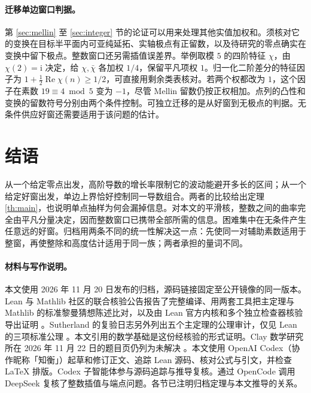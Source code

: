 \documentclass[UTF8,fontset=none,a4paper,11pt]{ctexart}
\theoremstyle{definition}
\newcommand{\re}{\operatorname{Re}}\newcommand{\e}{\varepsilon}
\begin{document}
\paragraph{迁移单边窗口判据。}
第 \ref{sec:mellin} 至 \ref{sec:integer} 节的论证可以用来处理其他实值加权和。须核对它的变换在目标半平面内可亚纯延拓、实轴极点有正留数，以及待研究的零点确实在变换中留下极点。整数窗口还另需插值误差界。举例取模 $5$ 的四阶特征 $\chi$，由 $\chi(2)=\mathrm i$ 决定，给 $\chi,\bar\chi$ 各加权 $1/4$，保留平凡项权 $1$。归一化二阶差分的特征因子为 $1+\tfrac12\re\chi(n)\ge1/2$，可直接用剩余类表核对。若两个权都改为 $1$，这个因子在素数 $19\equiv4\bmod5$ 变为 $-1$，尽管 Mellin 留数仍按正权相加。点列的凸性和变换的留数符号分别由两个条件控制。可独立迁移的是从好窗到无极点的判据。无条件供应好窗还需要适用于该问题的估计。


\section{结语}
从一个给定零点出发，高阶导数的增长率限制它的波动能避开多长的区间；从一个给定好窗出发，单边上界恰好控制同一导数组合。两者的比较给出定理 \ref{th:main}，也说明单点抽样为何会漏掉信息。对本文的平滑核，整数之间的曲率完全由平凡分量决定，因而整数窗口已携带全部所需的信息。困难集中在无条件产生任意远的好窗。归档用两条不同的统一性解决这一点：先使同一对辅助素数适用于整窗，再使整除和高度估计适用于同一族；两者承担的量词不同。

\paragraph{材料与写作说明。}
本文使用 2026 年 11 月 20 日发布的归档，源码链接固定至公开镜像的同一版本。Lean 与 Mathlib 社区的联合核验公告报告了完整编译、用两套工具把主定理与 Mathlib 的标准黎曼猜想陈述比对，以及由 Lean 官方内核和多个独立检查器核验导出证明 \cite{leanverification}。Sutherland 的复验日志另外列出五个主定理的公理审计，仅见 Lean 的三项标准公理 \cite{suth}。本文引用的数学基础是这份经核验的形式证明。Clay 数学研究所在 2026 年 11 月 22 日的题目页仍列为未解决 \cite{clayrh}。本文使用 OpenAI Codex（协作昵称「知衡」）起草和修订正文、追踪 Lean 源码、核对公式与引文，并检查 LaTeX 排版。Codex 子智能体参与源码追踪与推导复核。通过 OpenCode 调用 DeepSeek 复核了整数插值与端点问题。各节已注明归档定理与本文推导的关系。
\end{document}
